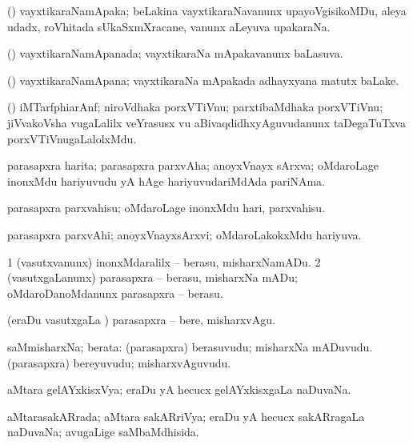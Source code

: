 \bentry
{}
\gl{\nA}
\bmng
(\Bwvi) vayxtikaraNamApaka; beLakina vayxtikaraNavanunx upayoVgisikoMDu, aleya udadx, roVhitada sUkaSxmXracane, \mo vanunx aLeyuva upakaraNa. 
\emng
\eentry

\bentry
{}
\gl{\gu}
\bmng
(\Bwvi) vayxtikaraNamApanada; vayxtikaraNa mApakavanunx baLasuva. 
\emng
\eentry

\bentry
{}
\gl{\nA}
\bmng
(\Bwvi) vayxtikaraNamApana; vayxtikaraNa mApakada adhayxyana matutx baLake. 
\emng
\eentry

\bentry
{}
\gl{\nA}
\bmng
(\jiVra) iMTarfphiarAnf; niroVdhaka porxVTiVnu; parxtibaMdhaka porxVTiVnu; jiVvakoVsha \mo vugaLalilx veYrasusx \mo vu aBivaqdidhxyAguvudanunx taDegaTuTxva porxVTiVnugaLalolxMdu. 
\emng
\eentry

\bentry
{}
\gl{\nA}
\bmng
parasapxra harita; parasapxra parxvAha; anoyxVnayx sArxva; oMdaroLage inonxMdu hariyuvudu yA hAge hariyuvudariMdAda pariNAma. 
\emng
\eentry

\bentry
{}
\gl{\akirx}
\bmng
parasapxra parxvahisu; oMdaroLage inonxMdu hari, parxvahisu. 
\emng
\eentry

\bentry
{}
\gl{\gu}
\bmng
parasapxra parxvAhi; anoyxVnayxsArxvi; oMdaroLakokxMdu hariyuva. 
\emng
\eentry

\bentry
{}
\gl{\sakirx}
\bmng
\bnum
\num{1} (vasutxvanunx) inonxMdaralilx -- berasu, misharxNamADu. 
\num{2} (vasutxgaLanunx) parasapxra -- berasu, misharxNa mADu; oMdaroDanoMdanunx parasapxra -- berasu. 
\enum
\emng

\noindent
\gl{\akirx}
\bmng
(eraDu vasutxgaLa \vi) parasapxra -- bere, misharxvAgu. 
\emng
\eentry

\bentry
{}
\gl{\nA}
\bmng
saMmisharxNa; berata: 
\banum
{} (parasapxra) berasuvudu; misharxNa mADuvudu. 
 (parasapxra) bereyuvudu; misharxvAguvudu. 
\eanum
\emng
\eentry

\bentry
{}
\gl{\gu}
\bmng
aMtara gelAYxkisxVya; eraDu yA hecucx gelAYxkisxgaLa naDuvaNa. 
\emng
\eentry

\bentry
{}
\gl{\gu}
\bmng
aMtarasakARrada; aMtara sakARriVya; eraDu yA hecucx sakARragaLa naDuvaNa; avugaLige saMbaMdhisida. 
\emng
\eentry

